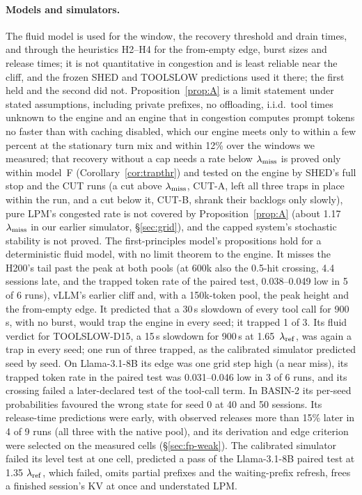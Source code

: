 \paragraph{Models and simulators.} The fluid model is used for the window, the recovery threshold and drain times, and through the heuristics H2--H4 for the from-empty edge, burst sizes and release times; it is not quantitative in congestion and is least reliable near the cliff, and the frozen SHED and TOOLSLOW predictions used it there; the first held and the second did not. Proposition~\ref{prop:A} is a limit statement under stated assumptions, including private prefixes, no offloading, i.i.d.\ tool times unknown to the engine and an engine that in congestion computes prompt tokens no faster than with caching disabled, which our engine meets only to within a few percent at the stationary turn mix and within 12\% over the windows we measured; that recovery without a cap needs a rate below $\lambda_{\mathrm{miss}}$ is proved only within model~F (Corollary~\ref{cor:trapthr}) and tested on the engine by SHED's full stop and the CUT runs (a cut above $\lambda_{\mathrm{miss}}$, CUT-A, left all three traps in place within the run, and a cut below it, CUT-B, shrank their backlogs only slowly), pure LPM's congested rate is not covered by Proposition~\ref{prop:A} (about 1.17~$\lambda_{\mathrm{miss}}$ in our earlier simulator, \S\ref{sec:grid}), and the capped system's stochastic stability is not proved. The first-principles model's propositions hold for a deterministic fluid model, with no limit theorem to the engine. It misses the H200's tail past the peak at both pools (at 600k also the 0.5-hit crossing, 4.4 sessions late, and the trapped token rate of the paired test, 0.038--0.049 low in 5 of 6 runs), vLLM's earlier cliff and, with a 150k-token pool, the peak height and the from-empty edge. It predicted that a 30\,s slowdown of every tool call for 900\,s, with no burst, would trap the engine in every seed; it trapped 1 of 3. Its fluid verdict for TOOLSLOW-D15, a 15\,s slowdown for 900\,s at 1.65~$\lambda_{\mathrm{ref}}$, was again a trap in every seed; one run of three trapped, as the calibrated simulator predicted seed by seed. On Llama-3.1-8B its edge was one grid step high (a near miss), its trapped token rate in the paired test was 0.031--0.046 low in 3 of 6 runs, and its crossing failed a later-declared test of the tool-call term. In BASIN-2 its per-seed probabilities favoured the wrong state for seed 0 at 40 and 50 sessions. Its release-time predictions were early, with observed releases more than 15\% later in 4 of 9 runs (all three with the native pool), and its derivation and edge criterion were selected on the measured cells (\S\ref{sec:fp-weak}). The calibrated simulator failed its level test at one cell, predicted a pass of the Llama-3.1-8B paired test at 1.35 $\lambda_{\mathrm{ref}}$, which failed, omits partial prefixes and the waiting-prefix refresh, frees a finished session's KV at once and understated LPM.


